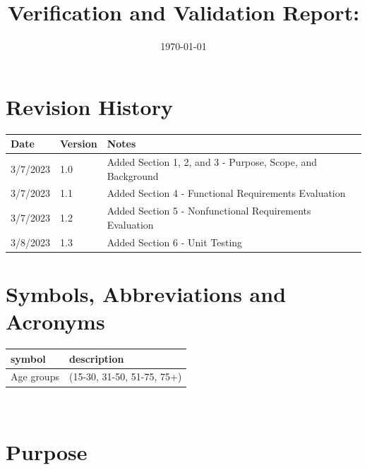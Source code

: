 \documentclass[12pt, titlepage]{article}
\begin{document}
\title{Verification and Validation Report: \progname} 
\author{\authname}
\date{\today}
	
\maketitle


\section*{Revision History}

\begin{tabularx}{\textwidth}{p{3cm}p{2cm}X}
\toprule {\bf Date} & {\bf Version} & {\bf Notes}\\
\midrule
3/7/2023 & 1.0 & Added Section 1, 2, and 3 - Purpose, Scope, and Background\\
3/7/2023 & 1.1 & Added Section 4 - Functional Requirements Evaluation\\
3/7/2023 & 1.2 & Added Section 5 - Nonfunctional Requirements Evaluation\\
3/8/2023 & 1.3 & Added Section 6 - Unit Testing\\
\bottomrule
\end{tabularx}

\newpage

\tableofcontents

\listoffigures

\listoftables

\newpage

\section*{Symbols, Abbreviations and Acronyms}


\renewcommand{\arraystretch}{1.2}
\begin{tabular}{l l} 
  \toprule		
  \textbf{symbol} & \textbf{description}\\
  \midrule 
  Age groups & (15-30, 31-50, 51-75, 75+)\\
  \bottomrule
\end{tabular}\\

\newpage


\section{Purpose}
\end{document}
